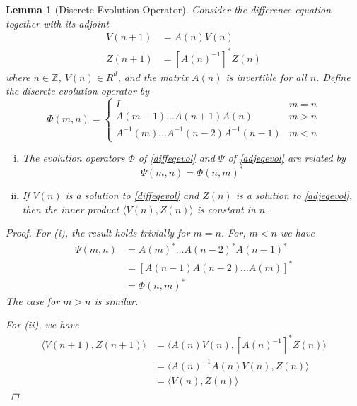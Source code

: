 \documentclass[12pt]{article}
\def\Z{{\mathbb Z}}
\newtheorem{lemma}{Lemma}
\begin{document}
\begin{lemma}[Discrete Evolution Operator]\label{evolop}
Consider the difference equation together with its adjoint
\begin{align}
V(n+1) &= A(n) V(n) \label{diffeqevol} \\
Z(n+1) &= [A(n)^{-1}]^* Z(n) \label{adjeqevol}
\end{align}
where $n \in \Z$, $V(n) \in R^d$, and the matrix $A(n)$ is invertible for all $n$. Define the discrete evolution operator by
\begin{equation}\label{evol}
\Phi(m, n) = 
\begin{cases}
I & m = n \\
A(m-1) \dots A(n+1) A(n) & m > n \\
A^{-1}(m) \dots A^{-1}(n-2) A^{-1}(n-1) & m < n
\end{cases}
\end{equation}
\begin{enumerate}[(i)]
\item The evolution operators $\Phi$ of \eqref{diffeqevol} and $\Psi$ of \eqref{adjeqevol} are related by
\begin{equation}\label{adjevol}
\Psi(m, n) = \Phi(n, m)^*
\end{equation}
\item If $V(n)$ is a solution to \eqref{diffeqevol} and $Z(n)$ is a solution to \eqref{adjeqevol}, then the inner product $\langle V(n), Z(n) \rangle$ is constant in $n$.
\end{enumerate}

\begin{proof}
For (i), the result holds trivially for $m = n$. For, $m < n$ we have
\begin{align*}
\Psi(m, n) &= A(m)^* \dots A(n-2)^* A(n-1)^* \\
&= [A(n-1) A(n-2) \dots A(m)]^* \\
&= \Phi(n, m)^*
\end{align*}
The case for $m > n$ is similar.

For (ii), we have
\begin{align*}
\langle V(n+1), Z(n+1) \rangle &= 
\langle A(n) V(n), [A(n)^{-1}]^* Z(n) \rangle \\
&= \langle A(n)^{-1} A(n) V(n), Z(n) \rangle \\
&= \langle V(n), Z(n) \rangle
\end{align*}
\end{proof}
\end{lemma}
\end{document}
